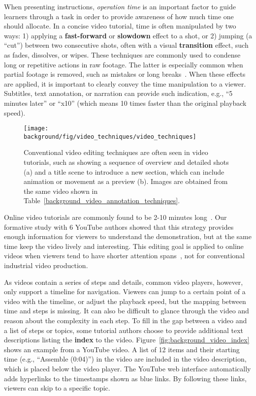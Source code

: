 
When presenting instructions, \emph{operation time} is an important factor to guide learners through a task in order to provide awareness of how much time one should allocate.
%
In a concise video tutorial, time is often manipulated by two ways: 1) applying a \textbf{fast-forward} or \textbf{slowdown} effect to a shot, or 2) jumping (a ``cut'') between two consecutive shots, often with a visual \textbf{transition} effect, such as fades, dissolves, or wipes. These techniques are commonly used to condense long or repetitive actions in raw footage. The latter is especially common when partial footage is removed, such as mistakes or long breaks~\cite{Tseng:2014:PVP:2598510.2598540}.
%
When these effects are applied, it is important to clearly convey the time manipulation to a viewer. Subtitles, text annotation, or narration can provide such indication, e.g., ``5 minutes later'' or ``x10'' (which means 10 times faster than the original playback speed).

\begin{figure*}[!t]
  \centering
  \texttt{[image: \\background/fig/video\_techniques/video\_techniques]}
  \caption{
    Conventional video editing techniques are often seen in video tutorials, such as showing
    a sequence of overview and detailed shots (a) and
    a title scene to introduce a new section, which can include animation or movement as a preview (b). Images are obtained from the same video shown in Table~\ref{background_video_annotation_techniques}.
  }
  \label{fig:background_video_techniques}
\end{figure*}


Online video tutorials are commonly found to be 2-10 minutes long~\cite{Chi:2013:DGC:2501988.2502052}. Our formative study with 6 YouTube authors showed that this strategy provides enough information for viewers to understand the demonstration, but at the same time keep the video lively and interesting. This editing goal is applied to online videos when viewers tend to have shorter attention spans~\cite{YouTubeVideoLength2016,YouTubeVideoLength2012}, not for conventional industrial video production.

As videos contain a series of steps and details, common video players, however, only support a timeline for navigation. Viewers can jump to a certain point of a video with the timeline, or adjust the playback speed, but the mapping between time and steps is missing. It can also be difficult to glance through the video and reason about the complexity in each step.
%
To fill in the gap between a video and a list of steps or topics, some tutorial authors choose to provide additional text descriptions listing the \textbf{index} to the video. Figure~\ref{fig:background_video_index} shows an example from a YouTube video. A list of 12 items and their starting time (e.g., ``Assemble (0:04)'') in the video are included in the video description, which is placed below the video player. The YouTube web interface automatically adds hyperlinks to the timestamps shown as blue links. By following these links, viewers can skip to a specific topic.

